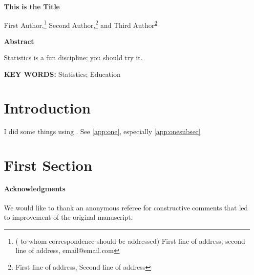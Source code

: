 \documentclass[12pt]{article}
\begin{document}
\thispagestyle{empty} \baselineskip=28pt

\begin{center}

{\LARGE{\bf This is the Title}}
\end{center}

\baselineskip=12pt
\vskip 2mm


\blind
{
    \begin{center}
      First Author,\footnote{(\baselineskip=10pt to whom correspondence should be addressed)
        First line of address,
        second line of address, email@email.com}
      Second Author,\footnote{\label{note:aff}\baselineskip=10pt
        First line of address,
        Second line of address}
      and Third Author\textsuperscript{\ref{note:aff}}
    \end{center}
} \fi

\vskip 2mm
\begin{center}
{\large{\bf Abstract}}
\end{center}
Statistics is a fun discipline; you should try it.
\baselineskip=12pt 

\baselineskip=12pt
\par\vfill\noindent
{\bf KEY WORDS:} 
Statistics; Education
\par\medskip\noindent


\clearpage\pagebreak\newpage {}
\baselineskip=24pt

\section{Introduction}\label{sec:intro}
I did some things using \citet{R2008}. See \ref{app:one}, especially \ref{app:onesubsec}
\section{First Section}\label{sec:first}

\paragraph{Acknowledgments} We would like to thank an anonymous
referee for constructive comments that led to improvement of the
original manuscript.

\clearpage\pagebreak\newpage\thispagestyle{empty}


\end{document}
